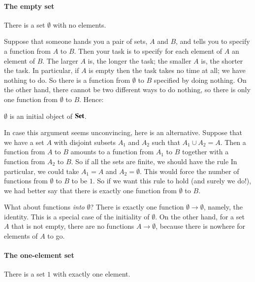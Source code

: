 \paragraph*{The empty set}  
%
%
There is a set $\emptyset$ with no elements.

Suppose that someone hands you a pair of sets, $A$ and $B$, and tells you
to specify a function from $A$ to $B$.  Then your task is to specify for
each element of $A$ an element of $B$.  The larger $A$ is, the longer the
task; the smaller $A$ is, the shorter the task.  In particular, if $A$ is
empty then the task takes no time at all; we have nothing to do.  So there
is a function from $\emptyset$ to $B$ specified by doing nothing.  On the
other hand, there cannot be two different ways to do nothing, so there is
only one function from $\emptyset$ to $B$.  Hence:
% 
\begin{setprop}
$\emptyset$ is an initial object of \hspace{.1em}$\mathbf{Set}$.
\end{setprop}

In case this argument seems unconvincing, here is an alternative.  Suppose
that we have a set $A$ with disjoint subsets $A_1$ and $A_2$ such that $A_1
\cup A_2 = A$.  Then a function from $A$ to $B$ amounts to a function from
$A_1$ to $B$ together with a function from $A_2$ to $B$.  So if all the
sets are finite, we should have the rule
% 
% 
In particular, we could take $A_1 = A$ and $A_2 = \emptyset$.  This would
force the number of functions from $\emptyset$ to $B$ to be $1$.  So if we
want this rule to hold (and surely we do!), we had better say that there is
exactly one function from $\emptyset$ to $B$.

What about functions \emph{into} $\emptyset$?  There is exactly one function
$\emptyset \to \emptyset$, namely, the identity.  This is a special case of
the initiality of $\emptyset$.  On the other hand, for a set $A$ that is not
empty, there are no functions $A \to \emptyset$, because there is nowhere for
elements of $A$ to go.


\paragraph*{The one-element set}  
%
%
There is a set $1$ with exactly one element.

